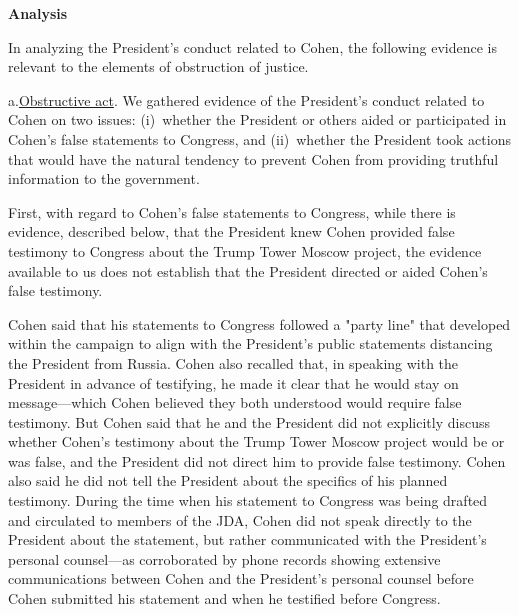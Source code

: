 \begin{center}
\textbf{Analysis}
\end{center}

In analyzing the President's conduct related to Cohen, the following evidence is relevant to the elements of obstruction of justice.

a.\qquad\underline{Obstructive act}.
We gathered evidence of the President's conduct related to Cohen on two issues:
(i)~whether the President or others aided or participated in Cohen's false statements to Congress, and
(ii)~whether the President took actions that would have the natural tendency to prevent Cohen from providing truthful information to the government.

First, with regard to Cohen's false statements to Congress, while there is evidence, described below, that the President knew Cohen provided false testimony to Congress about the Trump Tower Moscow project, the evidence available to us does not establish that the President directed or aided Cohen's false testimony.

Cohen said that his statements to Congress followed a "party line" that developed within the campaign to align with the President's public statements distancing the President from Russia.
Cohen also recalled that, in speaking with the President in advance of testifying, he made it clear that he would stay on message---which Cohen believed they both understood would require false testimony.
But Cohen said that he and the President did not explicitly discuss whether Cohen's testimony about the Trump Tower Moscow project would be or was false, and the President did not direct him to provide false testimony.
Cohen also said he did not tell the President about the specifics of his planned testimony.
During the time when his statement to Congress was being drafted and circulated to members of the JDA, Cohen did not speak directly to the President about the statement, but rather communicated with the President's personal counsel---as corroborated by phone records showing extensive communications between Cohen and the President's personal counsel before Cohen submitted his statement and when he testified before Congress.

